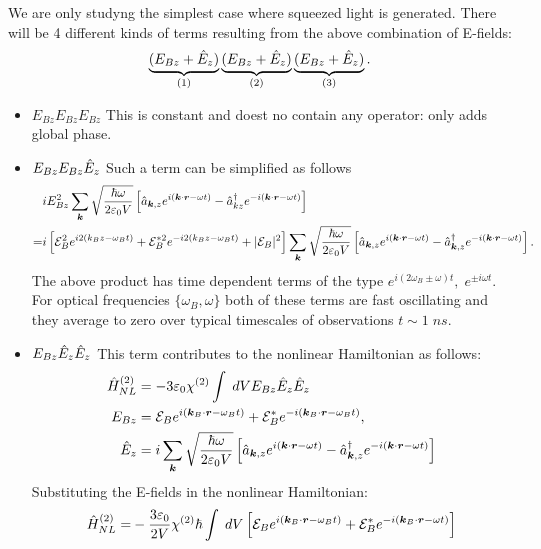 We are only studyng the simplest case where squeezed light is generated.
There will be 4 different kinds of terms resulting from the above combination of E-fields:
\begin{align*}
    \underbrace{(E_{Bz}+\hat{E}_z)}_{(1)}\underbrace{(E_{Bz}+\hat{E}_z)}_{(2)}\underbrace{(E_{Bz}+\hat{E}_z)}_{(3)}.
\end{align*}
\begin{itemize}[itemsep=0pt,topsep=0pt,parsep=0pt]
    \item[(1)] $E_{Bz}E_{Bz}E_{Bz}$ This is constant and doest no contain any operator: only adds global phase. 
    \item[(2)] $E_{Bz}E_{Bz}\hat{E}_z$ Such a term can be simplified as follows 
    \begin{align*}
        &iE_{Bz}^2\sum_{\bm{k}}\sqrt{\frac{\hbar\omega}{2\varepsilon_0V}}\left[\hat{a}_{\bm{k},z}e^{i(\bm{k}\cdot\bm{r}-\omega t)}-\hat{a}_{kz}^\dagger e^{-i(\bm{k}\cdot\bm{r}-\omega t)}\right]\\
        =&i\left[\mathcal{E}_B^2e^{i2(k_Bz-\omega_Bt)}+\mathcal{E}_B^{*2}e^{-i2(k_Bz-\omega_Bt)}+|\mathcal{E}_B|^2\right]\sum_{\bm{k}}\sqrt{\frac{\hbar\omega}{2\varepsilon_0V}}\left[\hat{a}_{\bm{k},z}e^{i(\bm{k}\cdot\bm{r}-\omega t)}-\hat{a}_{\bm{k},z}^\dagger e^{-i(\bm{k}\cdot\bm{r}-\omega t)}\right].
    \end{align*}
    The above product has time dependent terms of the type $e^{i(2\omega_B\pm\omega)t},\;e^{\pm i\omega t}$. For optical frequencies $\{\omega_B,\omega\}$ both of these 
    terms are fast oscillating and they average to zero over typical timescales of observations $t\sim1\;ns$. 
    \item[(3)] $E_{Bz}\hat{E}_z\hat{E}_z$ This term contributes to the nonlinear Hamiltonian as follows:
    \begin{align*}
        \hat{H}_{NL}^{(2)}&=-3\varepsilon_0\chi^{(2)}\int\;dV E_{Bz}\hat{E}_z\hat{E}_z\\
        E_{Bz}&=\mathcal{E}_Be^{i(\bm{k}_B\cdot\bm{r}-\omega_Bt)}+\mathcal{E}_B^*e^{-i(\bm{k}_B\cdot\bm{r}-\omega_Bt)},\\
        \hat{E}_z&=i\sum_{\bm{k}}\sqrt{\frac{\hbar\omega}{2\varepsilon_0V}}\left[\hat{a}_{\bm{k},z}e^{i(\bm{k}\cdot\bm{r}-\omega t)}-\hat{a}_{\bm{k},z}^\dagger e^{-i(\bm{k}\cdot\bm{r}-\omega t)}\right]
    \end{align*}
    Substituting the E-fields in the nonlinear Hamiltonian:
    \begin{align*}
        \hH_{NL}^{(2)}=&-\frac{3\varepsilon_0}{2V}\chi^{(2)}\hbar\int\;dV\left[\mathcal{E}_Be^{i(\bk_B\cdot\br-\omega_Bt)}+\mathcal{E}_B^*e^{-i(\bk_B\cdot\br-\omega t)}\right]\\

\end{align*}
\end{itemize}
